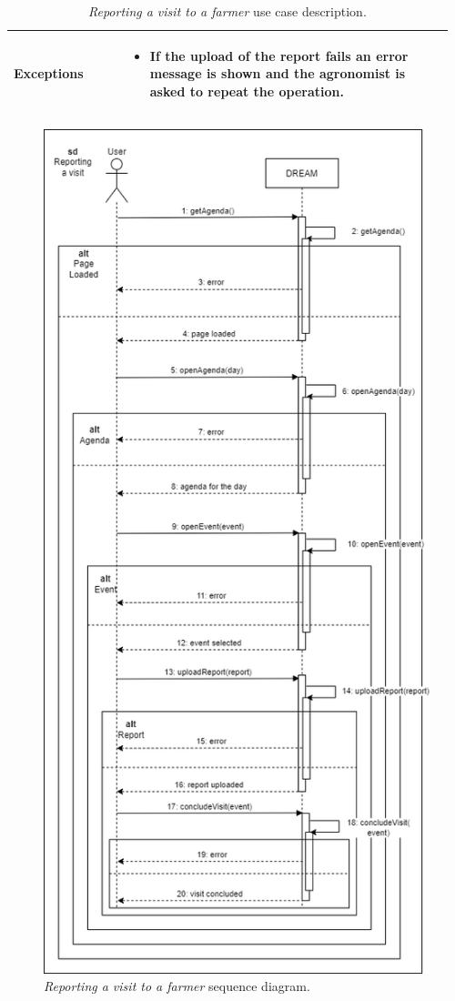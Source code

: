 \begin{table}[H]
\begin{tabular}{@{}p{0.25\linewidth}p{0.71\linewidth}@{}}
        \hline
        \textbf{Exceptions} &
        \begin{itemize}[leftmargin=.4cm,noitemsep,topsep=0pt,before=\vspace{-3mm},after=\vspace{-4mm}]
            \item If the upload of the report fails an error message is shown and the agronomist is asked to repeat the operation.
        \end{itemize} \\
        \hline
    \end{tabular}
    \caption{\textit{Reporting a visit to a farmer} use case description.}
\end{table}
\begin{figure}[H]
    \centering
    \includegraphics[height=1.5\linewidth]{Images/Use Case/UC16.png}
    \caption{\textit{Reporting a visit to a farmer} sequence diagram.}
\end{figure}
\newpage

